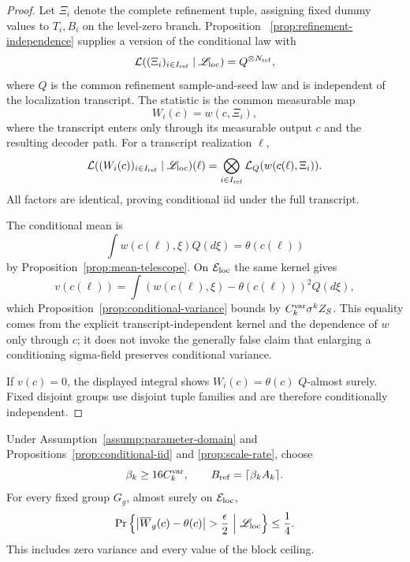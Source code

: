 \begin{proof}
Let $\Xi_i$ denote the complete refinement tuple, assigning fixed dummy
values to $T_i,B_i$ on the level-zero branch.  Proposition~
\ref{prop:refinement-independence} supplies a version of the conditional law
with
\[
 \mathcal L((\Xi_i)_{i\in I_{\rm ref}}\mid\mathscr L_{\rm loc})
 =Q^{\otimes N_{\rm ref}},
\]
where $Q$ is the common refinement sample-and-seed law and is independent of
the localization transcript.  The statistic is the common measurable map
\[
 W_i(c)=w(c,\Xi_i),
\]
where the transcript enters only through its measurable output $c$ and the
resulting decoder path.  For a transcript realization $\ell$,
\[
 \mathcal L((W_i(c))_{i\in I_{\rm ref}}\mid\mathscr L_{\rm loc})(\ell)
 =\bigotimes_{i\in I_{\rm ref}}
 \mathcal L_Q(w(c(\ell),\Xi_i)).
\]
All factors are identical, proving conditional iid under the full transcript.

The conditional mean is
\[
 \int w(c(\ell),\xi)Q(d\xi)=\theta(c(\ell))
\]
by Proposition~\ref{prop:mean-telescope}.  On
$\mathcal E_{\rm loc}$ the same kernel gives
\[
 v(c(\ell))=\int(w(c(\ell),\xi)-\theta(c(\ell)))^2Q(d\xi),
\]
which Proposition~\ref{prop:conditional-variance} bounds by
$C_k^{\rm var}\sigma^kZ_S$.  This equality comes from the explicit
transcript-independent kernel and the dependence of $w$ only through $c$;
it does not invoke the generally false claim that enlarging a conditioning
sigma-field preserves conditional variance.

If $v(c)=0$, the displayed integral shows
$W_i(c)=\theta(c)$ $Q$-almost surely.  Fixed disjoint groups use disjoint
tuple families and are therefore conditionally independent.
\end{proof}

\begin{lemma}
\label{lem:block-accuracy}
Under Assumption~\ref{assump:parameter-domain} and
Propositions~\ref{prop:conditional-iid} and \ref{prop:scale-rate}, choose
\[
 \beta_k\geq16C_k^{\rm var},
 \qquad B_{\rm ref}=\lceil\beta_kA_k\rceil.
\]
For every fixed group $G_g$, almost surely on $\mathcal E_{\rm loc}$,
\[
 \Pr\left\{\left|\overline W_g(c)-\theta(c)\right|>\frac\epsilon2
 \ \middle|\ \mathscr L_{\rm loc}\right\}\leq\frac14.
\]
This includes zero variance and every value of the block ceiling.
\end{lemma}

